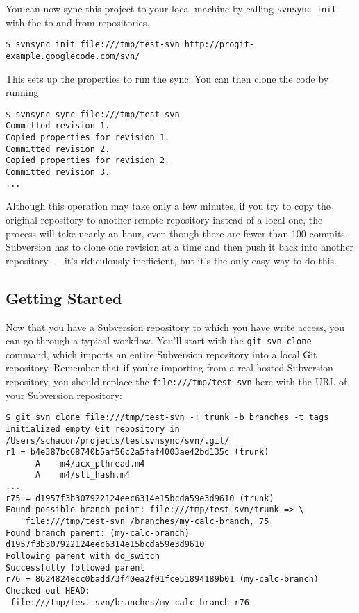 \documentclass[a4paper]{book}
\begin{document}
You can now sync this project to your local machine by calling \texttt{svnsync init} with the to and from repositories.

\begin{shaded}\begin{verbatim}
$ svnsync init file:///tmp/test-svn http://progit-example.googlecode.com/svn/
\end{verbatim}\end{shaded}

This sets up the properties to run the sync. You can then clone the code by running

\begin{shaded}\begin{verbatim}
$ svnsync sync file:///tmp/test-svn
Committed revision 1.
Copied properties for revision 1.
Committed revision 2.
Copied properties for revision 2.
Committed revision 3.
...
\end{verbatim}\end{shaded}

Although this operation may take only a few minutes, if you try to copy the original repository to another remote repository instead of a local one, the process will take nearly an hour, even though there are fewer than 100 commits. Subversion has to clone one revision at a time and then push it back into another repository --- it's ridiculously inefficient, but it's the only easy way to do this.

\subsection{Getting Started}

Now that you have a Subversion repository to which you have write access, you can go through a typical workflow. You'll start with the \texttt{git svn clone} command, which imports an entire Subversion repository into a local Git repository. Remember that if you're importing from a real hosted Subversion repository, you should replace the \texttt{file:///tmp/test-svn} here with the URL of your Subversion repository:

\begin{shaded}\begin{verbatim}
$ git svn clone file:///tmp/test-svn -T trunk -b branches -t tags
Initialized empty Git repository in /Users/schacon/projects/testsvnsync/svn/.git/
r1 = b4e387bc68740b5af56c2a5faf4003ae42bd135c (trunk)
      A    m4/acx_pthread.m4
      A    m4/stl_hash.m4
...
r75 = d1957f3b307922124eec6314e15bcda59e3d9610 (trunk)
Found possible branch point: file:///tmp/test-svn/trunk => \
    file:///tmp/test-svn /branches/my-calc-branch, 75
Found branch parent: (my-calc-branch) d1957f3b307922124eec6314e15bcda59e3d9610
Following parent with do_switch
Successfully followed parent
r76 = 8624824ecc0badd73f40ea2f01fce51894189b01 (my-calc-branch)
Checked out HEAD:
 file:///tmp/test-svn/branches/my-calc-branch r76
\end{verbatim}\end{shaded}
\end{document}
